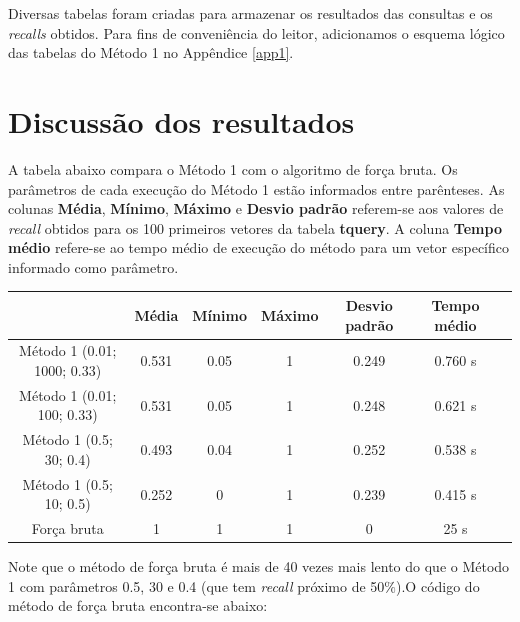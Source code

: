 \documentclass[a4paper,12pt,titlepage]{scrartcl}
\begin{document}
Diversas tabelas foram criadas para armazenar os resultados das consultas e os \emph{recalls} obtidos. Para fins de conveniência do leitor, adicionamos o esquema lógico das tabelas do Método 1 no Appêndice \ref{app1}. 

\section{Discussão dos resultados}

A tabela abaixo compara o Método 1 com o algoritmo de força bruta. Os parâmetros de cada execução do Método 1 estão informados entre parênteses. As colunas \textbf{Média}, \textbf{Mínimo}, \textbf{Máximo} e \textbf{Desvio padrão} referem-se aos valores de \emph{recall} obtidos para os 100 primeiros vetores da tabela \textbf{tquery}. A coluna \textbf{Tempo médio} refere-se ao tempo médio de execução do método para um vetor específico informado como parâmetro.  \\

\begin{center}
\begin{tabular}{|c|c|c|c|c|c|c|}
\hline
 & Média & Mínimo & Máximo & Desvio padrão & Tempo médio \\ \hline
Método 1 (0.01; 1000; 0.33) & 0.531 & 0.05 & 1 & 0.249 &  0.760 s \\ \hline
Método 1 (0.01; 100; 0.33) & 0.531 & 0.05 & 1  & 0.248 & 0.621 s   \\ \hline
Método 1 (0.5; 30; 0.4) & 0.493 & 0.04 & 1  & 0.252  & 0.538 s   \\ \hline
Método 1 (0.5; 10; 0.5) & 0.252  & 0 & 1  & 0.239  & 0.415 s    \\ \hline
Força bruta & 1 & 1 & 1 & 0  & 25 s  \\ \hline
\end{tabular}
\end{center}

Note que o método de força bruta é mais de 40 vezes mais lento do que o Método 1 com parâmetros 0.5, 30 e 0.4 (que tem \emph{recall} próximo de 50$\%$).O código do método de força bruta encontra-se abaixo:\\
\end{document}
